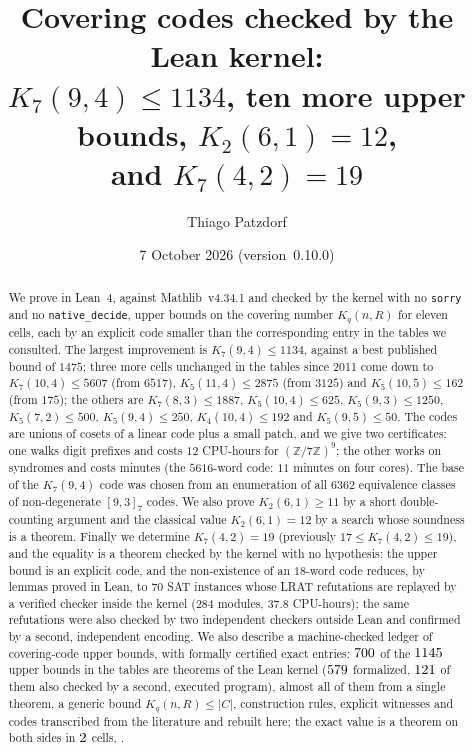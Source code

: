 \documentclass[11pt]{amsart}
\title[Covering codes checked by the Lean kernel]{Covering codes checked by the Lean kernel:\\ $K_7(9,4)\le 1134$, ten more upper bounds, $K_2(6,1)=12$,\\ and $K_7(4,2)=19$}
\author{Thiago Patzdorf}
\date{7 October 2026 (version~0.10.0)}
\theoremstyle{definition}
\theoremstyle{remark}
\begin{document}
\begin{abstract}
We prove in Lean~4, against Mathlib~v4.34.1 and checked by the kernel with no \texttt{sorry} and no \texttt{native\_decide}, upper bounds on the covering number $K_q(n,R)$ for eleven cells, each by an explicit code smaller than the corresponding entry in the tables we consulted.
The largest improvement is $K_7(9,4)\le 1134$, against a best published bound of $1475$; three more cells unchanged in the tables since 2011 come down to $K_7(10,4)\le 5607$ (from $6517$), $K_5(11,4)\le 2875$ (from $3125$) and $K_5(10,5)\le 162$ (from $175$); the others are $K_7(8,3)\le 1887$, $K_5(10,4)\le 625$, $K_5(9,3)\le 1250$, $K_5(7,2)\le 500$, $K_5(9,4)\le 250$, $K_4(10,4)\le 192$ and $K_5(9,5)\le 50$.
The codes are unions of cosets of a linear code plus a small patch, and we give two certificates: one walks digit prefixes and costs $12$ CPU-hours for $(\mathbb{Z}/7\mathbb{Z})^9$; the other works on syndromes and costs minutes (the $5616$-word code: $11$ minutes on four cores).
The base of the $K_7(9,4)$ code was chosen from an enumeration of all $6362$ equivalence classes of non-degenerate $[9,3]_7$ codes.
We also prove $K_2(6,1)\ge 11$ by a short double-counting argument and the classical value $K_2(6,1)=12$ by a search whose soundness is a theorem.
Finally we determine $K_7(4,2)=19$ (previously $17\le K_7(4,2)\le 19$), and the equality is a theorem checked by the kernel with no hypothesis: the upper bound is an explicit code, and the non-existence of an $18$-word code reduces, by lemmas proved in Lean, to $70$ SAT instances whose LRAT refutations are replayed by a verified checker inside the kernel ($284$ modules, $37.8$ CPU-hours); the same refutations were also checked by two independent checkers outside Lean and confirmed by a second, independent encoding.
We also describe a machine-checked ledger of covering-code upper bounds, with formally certified exact entries: $700$ of the $1145$ upper bounds in the tables are theorems of the Lean kernel ($579$ formalized, $121$ of them also checked by a second, executed program), almost all of them from a single theorem, a generic bound $K_q(n,R)\le|C|$, construction rules, explicit witnesses and codes transcribed from the literature and rebuilt here; the exact value is a theorem on both sides in $2$ cells, \ExatasLeanLista.


\end{abstract}
\end{document}
